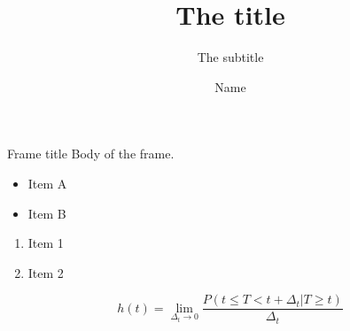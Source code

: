 \documentclass{beamer}
\title{The title}
\subtitle{The subtitle}
\author{Name}
\begin{document}
\begin{frame}
	\titlepage
\end{frame}

\begin{frame}{Frame title}
	Body of the frame.

	\begin{itemize}
		\item Item A
		\item Item B
	\end{itemize}

	\begin{enumerate}
		\item Item 1
		\item Item 2
	\end{enumerate}

	\[
		h(t) = \lim_{\Delta_t \to 0} \frac{P(t \le T < t + \Delta_t | T \ge t)}{\Delta_t}
	\]

\end{frame}
\end{document}
